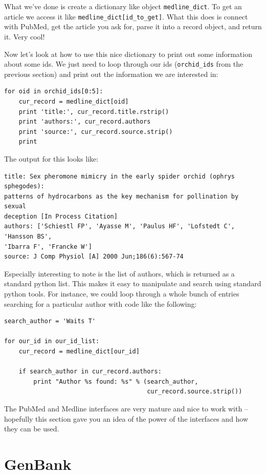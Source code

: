 \documentclass{report}
\begin{document}
What we've done is create a dictionary like object \verb|medline_dict|. To get an article we access it like \verb|medline_dict[id_to_get]|. What this does is connect with PubMed, get the article you ask for, parse it into a record object, and return it. Very cool!

Now let's look at how to use this nice dictionary to print out some information about some ids. We just need to loop through our ids (\verb|orchid_ids| from the previous section) and print out the information we are interested in:

\begin{verbatim}
for oid in orchid_ids[0:5]:
    cur_record = medline_dict[oid]
    print 'title:', cur_record.title.rstrip()
    print 'authors:', cur_record.authors
    print 'source:', cur_record.source.strip()
    print
\end{verbatim}

The output for this looks like:

\begin{verbatim}
title: Sex pheromone mimicry in the early spider orchid (ophrys sphegodes):
patterns of hydrocarbons as the key mechanism for pollination by sexual
deception [In Process Citation]
authors: ['Schiestl FP', 'Ayasse M', 'Paulus HF', 'Lofstedt C', 'Hansson BS',
'Ibarra F', 'Francke W']
source: J Comp Physiol [A] 2000 Jun;186(6):567-74
\end{verbatim}

Especially interesting to note is the list of authors, which is returned as a standard python list. This makes it easy to manipulate and search using standard python tools. For instance, we could loop through a whole bunch of entries searching for a particular author with code like the following:

\begin{verbatim}
search_author = 'Waits T'

for our_id in our_id_list:
    cur_record = medline_dict[our_id]
   
    if search_author in cur_record.authors:
        print "Author %s found: %s" % (search_author,
                                       cur_record.source.strip())
\end{verbatim}

The PubMed and Medline interfaces are very mature and nice to work with -- hopefully this section gave you an idea of the power of the interfaces and how they can be used.

\section{GenBank}
\end{document}

